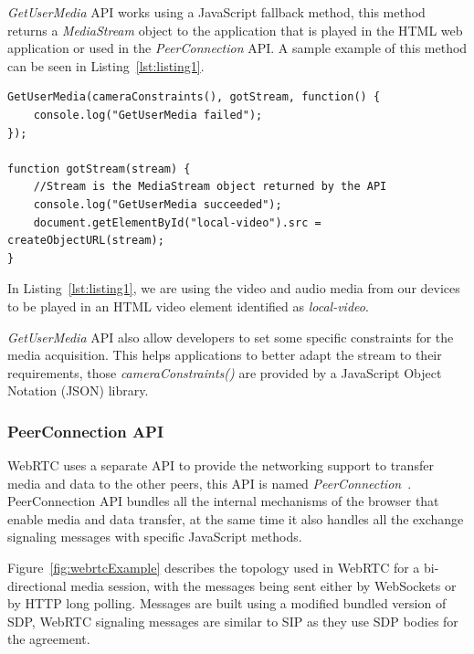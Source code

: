 {\it GetUserMedia} API works using a JavaScript fallback method, this method returns a {\it MediaStream} object to the application that is played in the HTML web application or used in the {\it PeerConnection} API. A sample example of this method can be seen in Listing~\ref{lst:listing1}.

\lstset{language=JavaScript}
\begin{lstlisting}[caption={Simple example of video and audio access using JavaScript},label={lst:listing1}]
GetUserMedia(cameraConstraints(), gotStream, function() {
	console.log("GetUserMedia failed");
});
    
function gotStream(stream) {
	//Stream is the MediaStream object returned by the API
	console.log("GetUserMedia succeeded");
  	document.getElementById("local-video").src = createObjectURL(stream);
}
\end{lstlisting}

In Listing~\ref{lst:listing1}, we are using the video and audio media from our devices to be played in an HTML video element identified as {\it local-video}. 

{\it GetUserMedia} API also allow developers to set some specific constraints for the media acquisition. This helps applications to better adapt the stream to their requirements, those {\it cameraConstraints()} are provided by a JavaScript Object Notation (JSON)  library.

\subsubsection{PeerConnection API}
\label{sec:pcAPI}

WebRTC uses a separate API to provide the networking support to transfer media and data to the other peers, this API is named {\it PeerConnection}~\cite{editorWebRTCdraft}. PeerConnection API bundles all the internal mechanisms of the browser that enable media and data transfer, at the same time it also handles all the exchange signaling messages with specific JavaScript methods. 

Figure~\ref{fig:webrtcExample} describes the topology used in WebRTC for a bi-directional media session, with the messages being sent either by WebSockets or by HTTP long polling. Messages are built using a modified bundled version of SDP, WebRTC signaling messages are similar to SIP as they use SDP bodies for the agreement.


